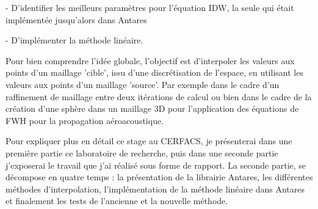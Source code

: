 - D'identifier les meilleurs paramètres pour l'équation \ac{IDW}, la seule qui était implémentée jusqu'alors dans Antares %

- D'implémenter la méthode linéaire.  %

\vspace{0,5cm}

Pour bien comprendre l'idée globale, l'objectif est d'interpoler les valeurs aux points d'un maillage 'cible', issu d'une discrétisation de l'espace, en utilisant les valeurs aux points d'un maillage 'source'.
Par exemple dans le cadre d'un raffinement de maillage entre deux itérations de calcul ou bien dans le cadre de la création d'une sphère dans un maillage 3D pour l'application des équations de FWH pour la propagation aéroacoustique.

\vspace{0,5cm}

Pour expliquer plus en détail ce stage au CERFACS, je présenterai dans une première partie ce laboratoire de recherche, puis dans une seconde partie j'exposerai le travail que j'ai réalisé sous forme de rapport. La seconde partie, se décompose en quatre temps : la présentation de la librairie Antares, les différentes méthodes d'interpolation, l'implémentation de la méthode linéaire dans Antares et finalement les tests de l'ancienne et la nouvelle méthode.